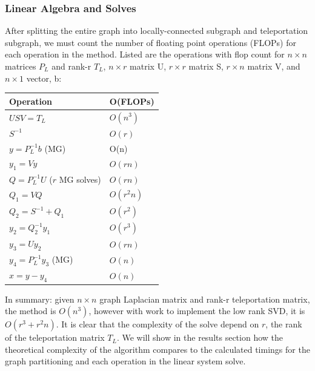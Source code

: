 \documentclass{article}
\begin{document}
\subsubsection{Linear Algebra and Solves}
After splitting the entire graph into locally-connected subgraph and teleportation subgraph, we must count the number of floating point operations (FLOPs) for each operation in the method. Listed are the operations with flop count for $n\times n$ matrices $P_L$ and rank-r $T_L$, $n\times r$ matrix U, $r\times r$ matrix S, $r\times n$ matrix V, and $n\times 1$ vector, b:\\
\begin{center}
\renewcommand{\arraystretch}{1.5}
    \begin{tabular}{ | l | l |}
    \hline
    \textbf{Operation} & \textbf{O(FLOPs)} \\ \hline
    $USV = T_L$ & $O(n^3)$ \\ \hline
    $S^{-1}$ & $O(r)$ \\ \hline
    $y = P_L^{-1}b$ (MG) & O(n)  \\  \hline
    $y_1 = Vy$ & $O(rn)$ \\ \hline
    $Q = P_L^{-1}U$ ($r$ MG solves) & $O(rn)$ \\ \hline
    $Q_1 = VQ$ & $O(r^2 n)$ \\ \hline
    $Q_2 = S^{-1} + Q_1$ & $O(r^2)$ \\ \hline
    $y_2 = Q_2^{-1}y_1$ & $O(r^3)$ \\ \hline
    $y_3 = Uy_2$ & $O(rn)$ \\ \hline
    $y_4 = P_L^{-1}y_3$ (MG) & $O(n)$ \\ \hline
    $x = y - y_4$ & $O(n)$ \\
    \hline
    \end{tabular}
\end{center}
In summary: given $n\times n$ graph Laplacian matrix and rank-r teleportation matrix, the method is $O(n^3)$, however with work to implement the low rank SVD, it is $O(r^3+r^2 n)$. It is clear that the complexity of the solve depend on $r$, the rank of the teleportation matrix $T_L$. We will show in the results section how the theoretical complexity of the algorithm compares to the calculated timings for the graph partitioning and each operation in the linear system solve.





%
%
\end{document}
